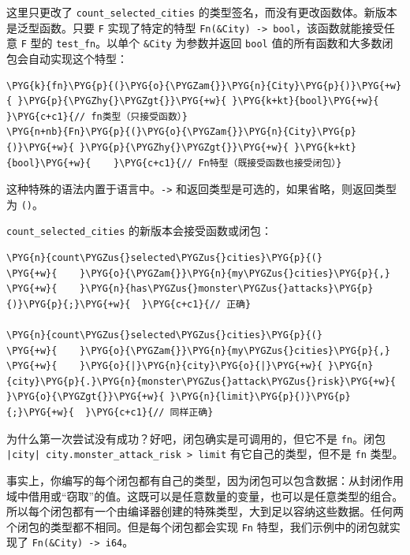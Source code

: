 这里只更改了 \texttt{count\_selected\_cities} 的类型签名，而没有更改函数体。新版本是泛型函数。只要 \texttt{F} 实现了特定的特型 \texttt{Fn(\&City) -> bool}，该函数就能接受任意 \texttt{F} 型的 \texttt{test\_fn}。以单个 \texttt{\&City} 为参数并返回 \texttt{bool} 值的所有函数和大多数闭包会自动实现这个特型：

\begin{Verbatim}[commandchars=\\\{\},breaklines=true,breakanywhere=true,fontsize=\codefont,xleftmargin=17bp]
\PYG{k}{fn}\PYG{p}{(}\PYG{o}{\PYGZam{}}\PYG{n}{City}\PYG{p}{)}\PYG{+w}{ }\PYG{p}{\PYGZhy{}\PYGZgt{}}\PYG{+w}{ }\PYG{k+kt}{bool}\PYG{+w}{    }\PYG{c+c1}{// fn类型（只接受函数）}
\PYG{n+nb}{Fn}\PYG{p}{(}\PYG{o}{\PYGZam{}}\PYG{n}{City}\PYG{p}{)}\PYG{+w}{ }\PYG{p}{\PYGZhy{}\PYGZgt{}}\PYG{+w}{ }\PYG{k+kt}{bool}\PYG{+w}{    }\PYG{c+c1}{// Fn特型（既接受函数也接受闭包）}
\end{Verbatim}

这种特殊的语法内置于语言中。\texttt{->} 和返回类型是可选的，如果省略，则返回类型为 \texttt{()}。

\texttt{count\_selected\_cities} 的新版本会接受函数或闭包：

\begin{Verbatim}[commandchars=\\\{\},breaklines=true,breakanywhere=true,fontsize=\codefont,xleftmargin=17bp]
\PYG{n}{count\PYGZus{}selected\PYGZus{}cities}\PYG{p}{(}
\PYG{+w}{    }\PYG{o}{\PYGZam{}}\PYG{n}{my\PYGZus{}cities}\PYG{p}{,}
\PYG{+w}{    }\PYG{n}{has\PYGZus{}monster\PYGZus{}attacks}\PYG{p}{)}\PYG{p}{;}\PYG{+w}{  }\PYG{c+c1}{// 正确}

\PYG{n}{count\PYGZus{}selected\PYGZus{}cities}\PYG{p}{(}
\PYG{+w}{    }\PYG{o}{\PYGZam{}}\PYG{n}{my\PYGZus{}cities}\PYG{p}{,}
\PYG{+w}{    }\PYG{o}{|}\PYG{n}{city}\PYG{o}{|}\PYG{+w}{ }\PYG{n}{city}\PYG{p}{.}\PYG{n}{monster\PYGZus{}attack\PYGZus{}risk}\PYG{+w}{ }\PYG{o}{\PYGZgt{}}\PYG{+w}{ }\PYG{n}{limit}\PYG{p}{)}\PYG{p}{;}\PYG{+w}{  }\PYG{c+c1}{// 同样正确}
\end{Verbatim}

为什么第一次尝试没有成功？好吧，闭包确实是可调用的，但它不是 \texttt{fn}。闭包 \texttt{|city| city.monster\_attack\_risk > limit} 有它自己的类型，但不是 \texttt{fn} 类型。

事实上，你编写的每个闭包都有自己的类型，因为闭包可以包含数据：从封闭作用域中借用或“窃取”的值。这既可以是任意数量的变量，也可以是任意类型的组合。所以每个闭包都有一个由编译器创建的特殊类型，大到足以容纳这些数据。任何两个闭包的类型都不相同。但是每个闭包都会实现 \texttt{Fn} 特型，我们示例中的闭包就实现了 \texttt{Fn(\&City) -> i64}。

